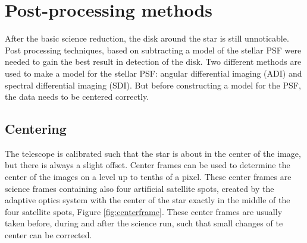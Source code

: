 \documentclass[twoside,single]{lion-msc}
\begin{document}
\section{Post-processing methods}
After the basic science reduction, the disk around the star is still unnoticable. Post processing techniques, based on subtracting a model of the stellar PSF were needed to gain the best result in detection of the disk. Two different methods are used to make a model for the stellar PSF: angular differential imaging (ADI) and spectral differential imaging (SDI). But before constructing a model for the PSF, the data needs to be centered correctly.

\subsection{Centering}
The telescope is calibrated such that the star is about in the center of the image, but there is always a slight offset. Center frames can be used to determine the center of the images on a level up to tenths of a pixel. These center frames are science frames containing also four artificial satellite spots, created by the adaptive optics system with the center of the star exactly in the middle of the four satellite spots, Figure \ref{fig:centerframe}. These center frames are usually taken before, during and after the science run, such that small changes of te center can be corrected. 
\end{document}
